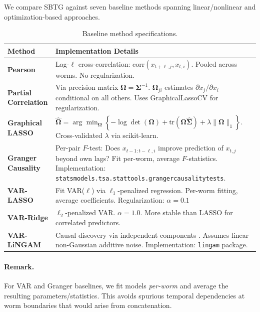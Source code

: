 \documentclass{article}
\theoremstyle{plain}
\theoremstyle{definition}
\theoremstyle{remark}
\newcommand{\1}{\mathbf{1}}
\newcommand{\Sig}{\bm{\Sigma}}
\newcommand{\Omeg}{\bm{\Omega}}
\begin{document}
We compare SBTG against seven baseline methods spanning linear/nonlinear and optimization-based approaches.

\begin{table}[h!]
\centering
\caption{Baseline method specifications.}
\label{tab:baseline_specs}
\begin{small}
\begin{tabular}{@{}l p{}@{}}
\toprule
\textbf{Method} & \textbf{Implementation Details} \\
\midrule
\textbf{Pearson} & Lag-$\ell$ cross-correlation: $\mathrm{corr}(x_{t+\ell,j}, x_{t,i})$. Pooled across worms. No regularization. \\
\midrule
\textbf{Partial Correlation} & Via precision matrix $\Omeg = \Sig^{-1}$. $\Omeg_{ji}$ estimates $\partial x_j / \partial x_i$ conditional on all others. Uses GraphicalLassoCV for regularization. \\
\midrule
\textbf{Graphical LASSO} & $\widehat{\Omeg} = \arg\min_{\Omeg} \left\{-\log\det(\Omeg) + \mathrm{tr}(\Omeg\widehat{\Sig}) + \lambda\|\Omeg\|_1\right\}$. Cross-validated $\lambda$ via scikit-learn. \\
\midrule
\textbf{Granger Causality} & Per-pair $F$-test: Does $x_{t-1:t-\ell,i}$ improve prediction of $x_{t,j}$ beyond own lags? Fit per-worm, average $F$-statistics. Implementation: \texttt{statsmodels.tsa.stattools.grangercausalitytests}. \\
\midrule
\textbf{VAR-LASSO} & Fit VAR($\ell$) via $\ell_1$-penalized regression. Per-worm fitting, average coefficients. Regularization: $\alpha = 0.1$ \\
\midrule
\textbf{VAR-Ridge} & $\ell_2$-penalized VAR. $\alpha = 1.0$. More stable than LASSO for correlated predictors. \\
\midrule
\textbf{VAR-LiNGAM} & Causal discovery via independent components \citep{Hyvarinen2013lingam}. Assumes linear non-Gaussian additive noise. Implementation: \texttt{lingam} package. \\
\bottomrule
\end{tabular}
\end{small}
\end{table}

\paragraph{Remark.}
For VAR and Granger baselines, we fit models \emph{per-worm} and average the resulting parameters/statistics. This avoids spurious temporal dependencies at worm boundaries that would arise from concatenation.
\end{document}
